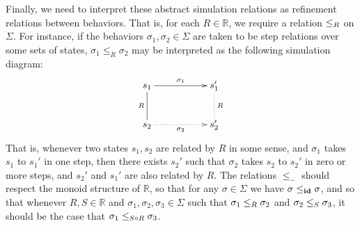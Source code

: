Finally,
we need to interpret these abstract simulation relations
as refinement relations between behaviors.
That is,
for each $R \in \mathbb{R}$, we require
a relation $\le_{R}$ on $\Sigma$.
For instance,
if the behaviors $\sigma_1, \sigma_2 \in \Sigma$
are taken to be step relations over some sets of states,
$\sigma_1 \le_R \sigma_2$ may be interpreted
as the following simulation diagram:
\[ 
    \xymatrix{
        s_1 \ar[rr]^{\sigma_1} \ar@{-}[d]_R & & s'_1 \ar@{.}[d]^R \\
        s_2 \ar@{.>}[rr]_{\sigma_2} & & s'_2
    }
\]
That is, whenever two states $s_1, s_2$
are related by $R$ in some sense,
and $\sigma_1$ takes $s_1$ to $s_1'$ in one step, then
there exists $s_2'$ such that 
$\sigma_2$ takes $s_2$ to $s_2'$ in zero or more steps,
and $s_2'$ and $s_1'$ are also related by $R$.
The relations $\le_-$ should respect the monoid structure of $\mathbb{R}$,
so that for any $\sigma \in \Sigma$ we have $\sigma \le_{\textbf{id}} \sigma$,
and so that whenever $R, S \in \mathbb{R}$
and $\sigma_1, \sigma_2, \sigma_3 \in \Sigma$
such that $\sigma_1 \le_{R} \sigma_2$ and $\sigma_2 \le_{S} \sigma_3$,
it should be the case that $\sigma_1 \le_{S \circ R} \sigma_3$.

